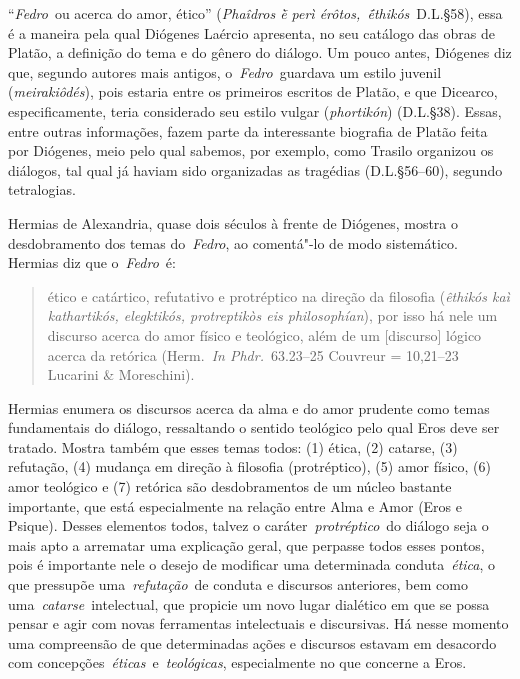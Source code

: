 


 
 

``\emph{Fedro}~ou acerca do amor, ético'' (\emph{Phaîdros ḕ perì
érôtos,~ḗthikós}~D.L.§58), essa é a maneira pela qual Diógenes Laércio
apresenta, no seu catálogo das obras de Platão, a definição do tema e do
gênero do diálogo. Um pouco antes, Diógenes diz que, segundo autores mais
antigos, o~\emph{Fedro}~guardava um estilo juvenil (\emph{meirakiôdés}),
pois estaria entre os primeiros escritos de Platão, e que Dicearco,
especificamente, teria considerado seu estilo vulgar (\emph{phortikón})
(D.L.§38). Essas, entre outras informações, fazem parte da interessante
biografia de Platão feita por Diógenes, meio pelo qual sabemos, por
exemplo, como Trasilo organizou os diálogos, tal qual já haviam sido
organizadas as tragédias (D.L.§56--60), segundo tetralogias.

Hermias de Alexandria, quase dois séculos à frente de Diógenes, mostra o
desdobramento dos temas do~\emph{Fedro}, ao comentá"-lo de modo
sistemático. Hermias diz que o~\emph{Fedro}~é:

 

\begin{quote}
\redondo{[…]} ético e catártico, refutativo e protréptico na direção da
filosofia (\emph{êthikós kaì kathartikós, elegktikós, protreptikòs eis
philosophían}), por isso há nele um discurso acerca do amor físico e
teológico, além de um [discurso] lógico acerca da retórica
(Herm.~\emph{In Phdr.}~63.23--25 Couvreur = 10,21--23 Lucarini \&
Moreschini).
\end{quote}

 

Hermias enumera os discursos acerca da alma e do amor prudente como
temas fundamentais do diálogo, ressaltando o sentido teológico pelo qual
Eros deve ser tratado. Mostra também que esses temas todos: (1) ética,
(2) catarse, (3) refutação, (4) mudança em direção à filosofia
(protréptico), (5) amor físico, (6) amor teológico e (7) retórica são
desdobramentos de um núcleo bastante importante, que está especialmente
na relação entre Alma e Amor (Eros e Psique). Desses elementos todos,
talvez o caráter~\emph{protréptico}~do diálogo seja o mais apto a
arrematar uma explicação geral, que perpasse todos esses pontos, pois é
importante nele o desejo de modificar uma determinada
conduta~\emph{ética}, o que pressupõe uma~\emph{refutação}~de conduta e
discursos anteriores, bem como uma~\emph{catarse}~intelectual, que
propicie um novo lugar dialético em que se possa pensar e agir com novas
ferramentas intelectuais e discursivas. Há nesse momento uma compreensão
de que determinadas ações e discursos estavam em desacordo com
concepções~\emph{éticas}~e~\emph{teológicas}, especialmente no que
concerne a Eros.

